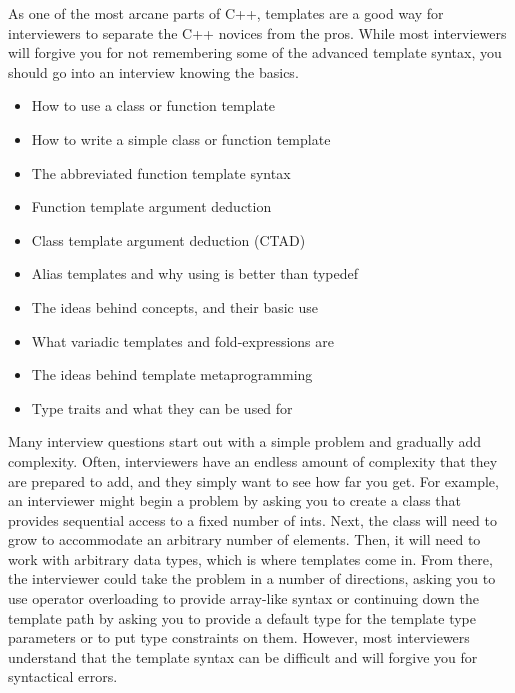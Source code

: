 
As one of the most arcane parts of C++, templates are a good way for interviewers to separate the C++ novices from the pros. While most interviewers will forgive you for not remembering some of the advanced template syntax, you should go into an interview knowing the basics.


\begin{itemize}
\item
How to use a class or function template

\item
How to write a simple class or function template

\item
The abbreviated function template syntax

\item
Function template argument deduction

\item
Class template argument deduction (CTAD)

\item
Alias templates and why using is better than typedef

\item
The ideas behind concepts, and their basic use

\item
What variadic templates and fold-expressions are

\item
The ideas behind template metaprogramming

\item
Type traits and what they can be used for
\end{itemize}


Many interview questions start out with a simple problem and gradually add complexity. Often, interviewers have an endless amount of complexity that they are prepared to add, and they simply want to see how far you get. For example, an interviewer might begin a problem by asking you to create a class that provides sequential access to a fixed number of ints. Next, the class will need to grow to accommodate an arbitrary number of elements. Then, it will need to work with arbitrary data types, which is where templates come in. From there, the interviewer could take the problem in a number of directions, asking you to use operator overloading to provide array-like syntax or continuing down the template path by asking you to provide a default type for the template type parameters or to put type constraints on them. However, most interviewers understand that the template syntax can be difficult and will forgive you for syntactical errors.

